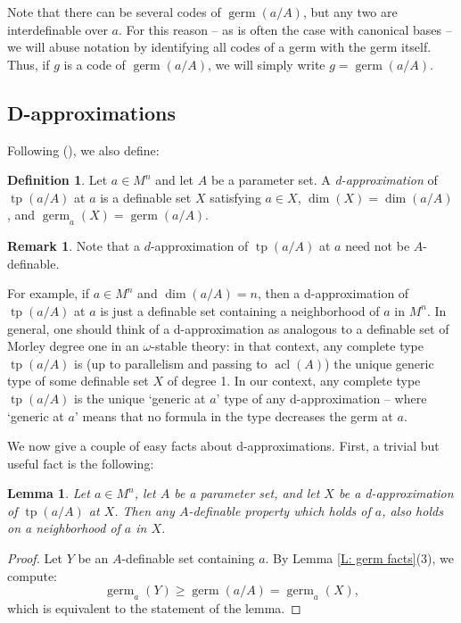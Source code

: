 \documentclass{amsart}
\newtheorem{lemma}[theorem]{Lemma}
\theoremstyle{definition}
\newtheorem{definition}[theorem]{Definition}
\newtheorem{remark}[theorem]{Remark}
\newcommand{\acl}{\operatorname{acl}}
\newcommand{\tp}{\operatorname{tp}}
\begin{document}
Note that there can be several codes of $\operatorname{germ}(a/A)$, but any two are interdefinable over $a$. For this reason -- as is often the case with canonical bases -- we will abuse notation by identifying all codes of a germ with the germ itself. Thus, if $g$ is a code of $\operatorname{germ}(a/A)$, we will simply write $g=\operatorname{germ}(a/A)$.

\subsection{D-approximations} Following (\cite[Definition 3.16]{CasHasYe}), we also define:

\begin{definition}
    Let $a\in M^n$ and let $A$ be a parameter set. A \textit{d-approximation} of $\tp(a/A)$ at $a$ is a definable set $X$ satisfying $a\in X$, $\dim(X)=\dim(a/A)$, and $\operatorname{germ}_a(X)=\operatorname{germ}(a/A)$. 
\end{definition}

\begin{remark} Note that a $d$-approximation of $\operatorname{tp}(a/A)$ at $a$ need not be $A$-definable.
\end{remark}

For example, if $a\in M^n$ and $\dim(a/A)=n$, then a d-approximation of $\tp(a/A)$ at $a$ is just a definable set containing a neighborhood of $a$ in $M^n$. In general, one should think of a d-approximation as analogous to a definable set of Morley degree one in an $\omega$-stable theory: in that context, any complete type $\tp(a/A)$ is (up to parallelism and passing to $\acl(A)$) the unique generic type of some definable set $X$ of degree 1. In our context, any complete type $\tp(a/A)$ is the unique `generic at $a$' type of any d-approximation -- where `generic at $a$' means that no formula in the type decreases the germ at $a$. 

We now give a couple of easy facts about d-approximations. First, a trivial but useful fact is the following:

\begin{lemma}\label{L: d-app locality} Let $a\in M^n$, let $A$ be a parameter set, and let $X$ be a d-approximation of $\tp(a/A)$ at $X$. Then any $A$-definable property which holds of $a$, also holds on a neighborhood of $a$ in $X$.
\end{lemma}
\begin{proof}
    Let $Y$ be an $A$-definable set containing $a$. By Lemma \ref{L: germ facts}(3), we compute: $$\operatorname{germ}_a(Y)\geq\operatorname{germ}(a/A)=\operatorname{germ}_a(X),$$ which is equivalent to the statement of the lemma.
\end{proof}
\end{document}
